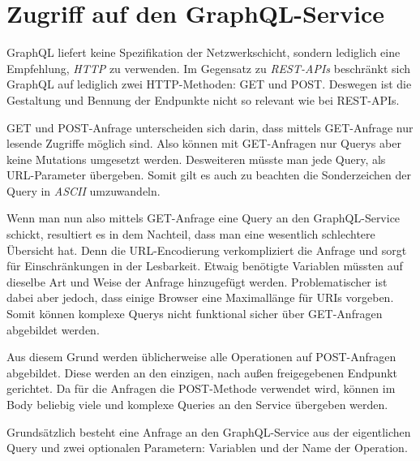 \section{Zugriff auf den GraphQL-Service}
GraphQL liefert keine Spezifikation der Netzwerkschicht, sondern lediglich eine Empfehlung, \textit{HTTP} zu verwenden.
Im Gegensatz zu \textit{REST-APIs} beschränkt sich GraphQL auf lediglich zwei HTTP-Methoden: GET und POST.
Deswegen ist die Gestaltung und Bennung der Endpunkte nicht so relevant wie bei REST-APIs.
\newline

GET und POST-Anfrage unterscheiden sich darin, dass mittels GET-Anfrage nur lesende Zugriffe möglich sind.
Also können mit GET-Anfragen nur Querys aber keine Mutations umgesetzt werden.
Desweiteren müsste man jede Query, als URL-Parameter übergeben.
Somit gilt es auch zu beachten die Sonderzeichen der Query in \textit{ASCII} umzuwandeln.
\newline

Wenn man nun also mittels GET-Anfrage eine Query an den GraphQL-Service schickt, resultiert es in dem Nachteil, dass man eine wesentlich schlechtere Übersicht hat. 
Denn die URL-Encodierung verkompliziert die Anfrage und sorgt für Einschränkungen in der Lesbarkeit.
Etwaig benötigte Variablen müssten auf dieselbe Art und Weise der Anfrage hinzugefügt werden.
Problematischer ist dabei aber jedoch, dass einige Browser eine Maximallänge für URIs vorgeben.
Somit können komplexe Querys nicht funktional sicher über GET-Anfragen abgebildet werden.
\newline

Aus diesem Grund werden üblicherweise alle Operationen auf POST-Anfragen abgebildet.
Diese werden an den einzigen, nach außen freigegebenen Endpunkt gerichtet.
Da für die Anfragen die POST-Methode verwendet wird, können im Body beliebig viele und komplexe Queries an den Service übergeben werden.
\newline

Grundsätzlich besteht eine Anfrage an den GraphQL-Service aus der eigentlichen Query und zwei optionalen Parametern: Variablen und der Name der Operation.



